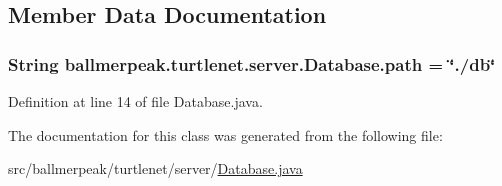 \subsection{Member Data Documentation}
\hypertarget{classballmerpeak_1_1turtlenet_1_1server_1_1Database_a3933689115f43166439d740b2a254481}{
\subsubsection[{path}]{\setlength{\rightskip}{0pt plus 5cm}String ballmerpeak.\-turtlenet.\-server.\-Database.\-path = \char`\"{}./db\char`\"{}\hspace{0.3cm}{\ttfamily [static]}}}\label{classballmerpeak_1_1turtlenet_1_1server_1_1Database_a3933689115f43166439d740b2a254481}


Definition at line 14 of file Database.\-java.



The documentation for this class was generated from the following file\-:\begin{DoxyCompactItemize}
\item 
src/ballmerpeak/turtlenet/server/\hyperlink{Database_8java}{Database.\-java}\end{DoxyCompactItemize}
